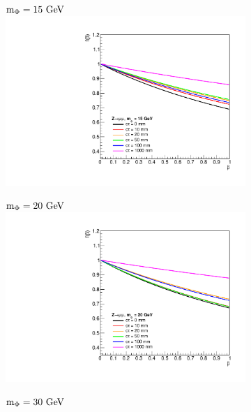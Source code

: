 \begin{figure}[htb!]
	\centering
	\captionsetup[subfigure]{justification=centering}
	\begin{subfigure}{0.3\linewidth}
		\centering
		$\mphi=15\unit{GeV}$
		\includegraphics[width=\linewidth]{figs/05_analysis/BR_Z_MU_15.pdf}
	\end{subfigure}
	\begin{subfigure}{0.3\linewidth}
		\centering
		$\mphi=20\unit{GeV}$
		\includegraphics[width=\linewidth]{figs/05_analysis/BR_Z_MU_20.pdf}
	\end{subfigure}
	\begin{subfigure}{0.3\linewidth}
		\centering
		$\mphi=30\unit{GeV}$

\end{subfigure}
\end{figure}
